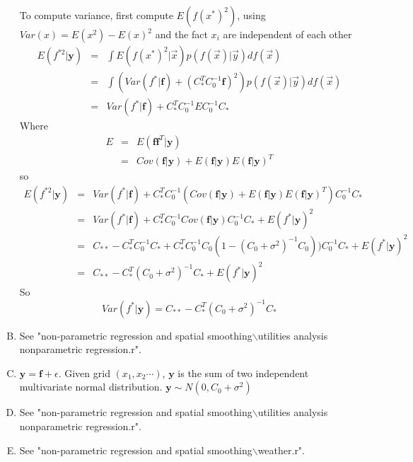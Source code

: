 \documentclass{article}
\begin{document}
\begin{enumerate}[(A)]
To compute variance, first compute $E(f(x^*)^2)$, using $Var(x)=E(x^2)-E(x)^2$ and the fact $x_i$ are independent of each other
\begin{eqnarray}
E(f^{*2}|\mathbf{y})&=&\int E(f(x^*)^2|\vec{x})p(f(\vec{x})|\vec{y})df(\vec{x})\nonumber\\
&=&\int(Var(f^*|\mathbf{f})+(C_*^TC_0^{-1}\mathbf{f})^2)p(f(\vec{x})|\vec{y})df(\vec{x})\nonumber\\
&=&Var(f^*|\mathbf{f})+C_*^TC_0^{-1}EC_0^{-1}C_*
\end{eqnarray}
Where 
\begin{eqnarray}
E&=&E(\mathbf{f}\mathbf{f}^T|\mathbf{y})\nonumber\\
&=&Cov(\mathbf{f}|\mathbf{y})+E(\mathbf{f}|\mathbf{y})E(\mathbf{f}|\mathbf{y})^T
\end{eqnarray}
so
\begin{eqnarray}
E(f^{*2}|\mathbf{y})&=&Var(f^*|\mathbf{f})+C_*^TC_0^{-1}(Cov(\mathbf{f}|\mathbf{y})+E(\mathbf{f}|\mathbf{y})E(\mathbf{f}|\mathbf{y})^T)C_0^{-1}C_*\nonumber\\
&=&Var(f^*|\mathbf{f})+C_*^TC_0^{-1}Cov(\mathbf{f}|\mathbf{y})C_0^{-1}C_*+E(f^*|\mathbf{y})^2\nonumber\\
&=&C_{**}-C_*^TC_0^{-1}C_*+C_*^TC_0^{-1}C_0\left(1-(C_0+\sigma^2)^{-1}C_0\right))C_0^{-1}C_*+E(f^*|\mathbf{y})^2\nonumber\\
&=&C_{**}-C_*^T(C_0+\sigma^2)^{-1}C_*+E(f^*|\mathbf{y})^2
\end{eqnarray}
So
\[
Var(f^*|\mathbf{y})=C_{**}-C_*^T(C_0+\sigma^2)^{-1}C_*
\]
\item
See "non-parametric regression and spatial smoothing$\backslash$utilities analysis nonparametric regression.r".
\item
$\mathbf{y}=\mathbf{f}+\epsilon$. Given grid $(x_1,x_2\cdots)$, $\mathbf{y}$ is the sum of two independent multivariate normal distribution. $\mathbf{y}\sim N(0,C_0+\sigma^2)$
\item
See "non-parametric regression and spatial smoothing$\backslash$utilities analysis nonparametric regression.r".
\item
See "non-parametric regression and spatial smoothing$\backslash$weather.r".
\end{enumerate}
\end{document}
